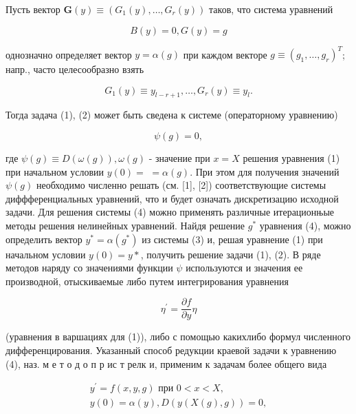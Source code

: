 \documentclass[10pt]{article}
\begin{document}
Пусть вектор $\boldsymbol{G}(y) \equiv\left(G_{1}(y), \ldots, G_{r}(y)\right)$ таков, что система уравнений



\[

B(y)=0, G(y)=g

\]



однозначно определяет вектор $y=\alpha(g)$ при каждом векторе $g \equiv\left(g_{1}, \ldots, g_{r}\right)^{T}$; напр., часто целесообразно взять



\[

G_{1}(y) \equiv y_{l-r+1}, \ldots, G_{r}(y) \equiv y_{l} .

\]



Тогда задача (1), (2) может быть сведена к системе (операторному уравнению)



\[

\psi(g)=0,

\]



где $\psi(g) \equiv D(\omega(g)), \omega(g)$ - значение при $x=X$ решения уравнения (1) при начальном условии $y(0)=$ $=\alpha(g)$. При этом для получения значений $\psi(g)$ необходимо численно решать (см. [1], [2]) соответствующие системы диффференциальных уравнений, что и будет означать дискретизацию исходной задачи. Для решения системы (4) можно применять различные итерационњые методы решения нелинейных уравнений. Найдя решение $g^{*}$ уравнения (4), можно определить вектор $y^{*}=\alpha\left(g^{*}\right)$ из системы (3) и, решая уравнение (1) при начальном условии $y(0)=y *$, получить решение задачи (1), (2). В ряде методов наряду со значениями функции $\psi$ используются и значения ее производной, отыскиваемые либо путем интегрирования уравнения



\[

\eta^{\prime}=\frac{\partial f}{\partial y} \eta

\]



(уравнения в варшациях для (1)), либо с помощью какихлибо формул численного дифференцирования. Указанный способ редукции краевой задачи к уравнению (4), наз. м е т о д о п р ис т релк и, применим к задачам более общего вида



\[

\begin{gathered}

y^{\prime}=f(x, y, g) \text { при } 0<x<X, \\

y(0)=\alpha(y), D(y(X(g), g))=0,

\end{gathered}

\]
\end{document}
